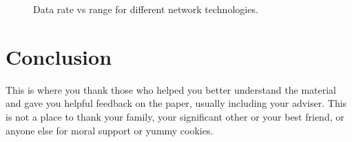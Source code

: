 \documentclass[sigplan,screen,nonacm]{acmart}
\begin{document}
\begin{figure}[htbp]
  \centering
  \caption{Data rate vs range for different network technologies. \cite{evanczukspeed}}
  \label{fig:LPWAN_data_rate_range}
\end{figure}

\section{Conclusion}
\label{sec:Coclusion}


\begin{acks}
  This is where you thank those who helped you better understand the material
  and gave you helpful feedback on the paper, usually including your adviser.
  This is not a place to thank your family, your significant other or your best friend,
  or anyone else  for moral support or yummy cookies.
\end{acks}



\end{document}
